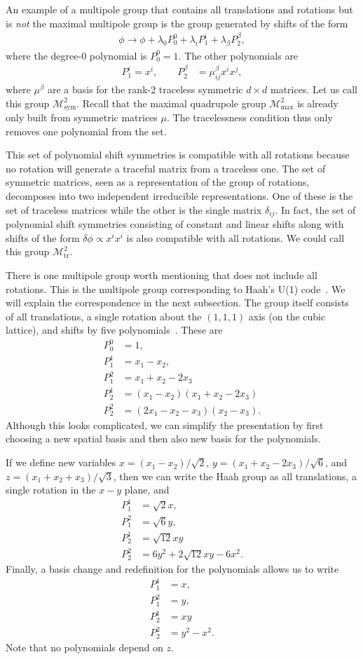 \documentclass[pra,aps,twocolumn, amsfonts,amsmath,amssymb,nofootinbib,superscriptaddress]{revtex4-2}
\newcommand{\nn}{\nonumber\\}
\newcommand{\goesto}{\rightarrow}
\begin{document}
An example of a multipole group that contains all translations and rotations but is \emph{not} the maximal multipole group is the group generated by shifts of the form
\begin{align}
\phi \goesto \phi + \lambda_0 P_0^0 + \lambda_{i} P^{i}_1 + \lambda_{\beta} P^{\beta}_2,
\end{align}
where the degree-0 polynomial is $P_0^0=1$. The other polynomials are
\begin{align}
P_1^{i} = x^i,\quad \quad P_2^{\beta} &= \mu^{\beta}_{ij} x^i x^j,
\end{align}
where $\mu^{\beta}$ are a basis for the rank-2 traceless symmetric $d\times d$ matrices. Let us call this group $\mathcal{M}^2_{\text{sym}}$. Recall that the maximal quadrupole group $\mathcal{M}^2_{\text{max}}$ is already only built from symmetric matrices $\mu$. The tracelessness condition thus only removes one polynomial from the set. 

This set of polynomial shift symmetries is compatible with all rotations because no rotation will generate a traceful matrix from a traceless one. The set of symmetric matrices, seen as a representation of the group of rotations, decomposes into two independent irreducible representations. One of these is the set of traceless matrices while the other is the single matrix $\delta_{ij}$. In fact, the set of polynomial shift symmetries consisting of constant and linear shifts along with shifts of the form $\delta \phi \propto x^ix^i$ is also compatible with all rotations. We could call this group $\mathcal{M}^2_\text{tr}$.

There is one multipole group worth mentioning that does not include all rotations. This is the multipole group corresponding to Haah's U(1) code~\cite{Haah2017, BB, Gromov2019}. We will explain the correspondence in the next subsection. The group itself consists of all translations, a single rotation about the $(1,1,1)$ axis (on the cubic lattice), and shifts by five polynomials~\cite{Gromov2019}. These are
\begin{align}
P_0^0 &= 1, \nn
P_1^1 &= x_1 - x_2,\nn
P_1^2 &= x_1 + x_2 - 2x_3\nn
P_2^1 &= (x_1 - x_2) (x_1 + x_2 - 2x_3)\nn
P_2^2 &= (2x_1 - x_2 - x_3) (x_2 - x_3).
\end{align}
Although this looks complicated, we can simplify the presentation by first choosing a new spatial basis and then also new basis for the polynomials.

If we define new variables $x = (x_1 - x_2)/\sqrt{2}$, $y = (x_1 + x_2 - 2x_3)/\sqrt{6}$, and $z = (x_1 + x_2 + x_3)/\sqrt{3}$, then we can write the Haah group as all translations, a single rotation in the $x-y$ plane, and
\begin{align}
P_1^1 &= \sqrt{2} x , \nn
P_1^2 &= \sqrt{6} y, \nn
P_2^1 &= \sqrt{12} xy\nn
P_2^2 &= 6y^2 +2\sqrt{12} xy - 6x^2.
\end{align}
Finally, a basis change and redefinition for the polynomials allows us to write
\begin{align}
P_1^1 &= x , \nn
P_1^2 &= y, \nn
P_2^1 &= xy\nn
P_2^2 &= y^2 - x^2.
\end{align}
Note that no polynomials depend on $z$.
\end{document}
